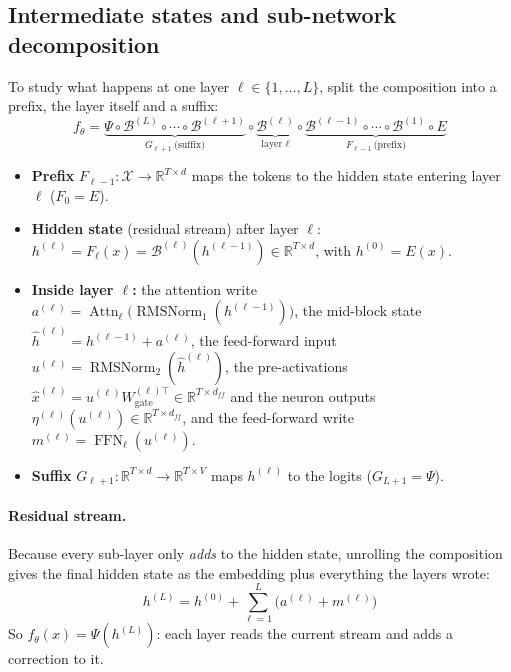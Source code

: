 \documentclass[10pt,a4paper]{article}
\newcommand{\op}[1]{\operatorname{#1}}
\theoremstyle{definition}
\begin{document}
\subsection{Intermediate states and sub-network decomposition}
To study what happens at one layer $\ell\in\{1,\dots,L\}$, split the composition into a prefix, the layer itself and a suffix:
\begin{equation}
  f_\theta = \underbrace{\Psi\circ\mathcal{B}^{(L)}\circ\cdots\circ\mathcal{B}^{(\ell+1)}}_{G_{\ell+1}\ \text{(suffix)}}\circ\underbrace{\mathcal{B}^{(\ell)}}_{\text{layer }\ell}\circ\underbrace{\mathcal{B}^{(\ell-1)}\circ\cdots\circ\mathcal{B}^{(1)}\circ E}_{F_{\ell-1}\ \text{(prefix)}}
\end{equation}
\begin{itemize}
\item \textbf{Prefix} $F_{\ell-1}:\mathcal{X}\to\mathbb{R}^{T\times d}$ maps the tokens to the hidden state entering layer $\ell$ ($F_0=E$).
\item \textbf{Hidden state} (residual stream) after layer $\ell$: $h^{(\ell)}=F_\ell(x)=\mathcal{B}^{(\ell)}(h^{(\ell-1)})\in\mathbb{R}^{T\times d}$, with $h^{(0)}=E(x)$.
\item \textbf{Inside layer $\ell$:} the attention write $a^{(\ell)}=\op{Attn}_\ell\big(\op{RMSNorm}_{1}(h^{(\ell-1)})\big)$, the mid-block state $\hat h^{(\ell)}=h^{(\ell-1)}+a^{(\ell)}$, the feed-forward input $u^{(\ell)}=\op{RMSNorm}_{2}(\hat h^{(\ell)})$, the pre-activations $\hat x^{(\ell)}=u^{(\ell)}W^{(\ell)\top}_{\mathrm{gate}}\in\mathbb{R}^{T\times d_{ff}}$ and the neuron outputs $\eta^{(\ell)}(u^{(\ell)})\in\mathbb{R}^{T\times d_{ff}}$, and the feed-forward write $m^{(\ell)}=\op{FFN}_\ell(u^{(\ell)})$.
\item \textbf{Suffix} $G_{\ell+1}:\mathbb{R}^{T\times d}\to\mathbb{R}^{T\times V}$ maps $h^{(\ell)}$ to the logits ($G_{L+1}=\Psi$).
\end{itemize}
\paragraph{Residual stream.} Because every sub-layer only \emph{adds} to the hidden state, unrolling the composition gives the final hidden state as the embedding plus everything the layers wrote:
\begin{equation}
  h^{(L)} = h^{(0)} + \sum_{\ell=1}^{L}\big(a^{(\ell)}+m^{(\ell)}\big)
\end{equation}
So $f_\theta(x)=\Psi(h^{(L)})$: each layer reads the current stream and adds a correction to it.
\end{document}
